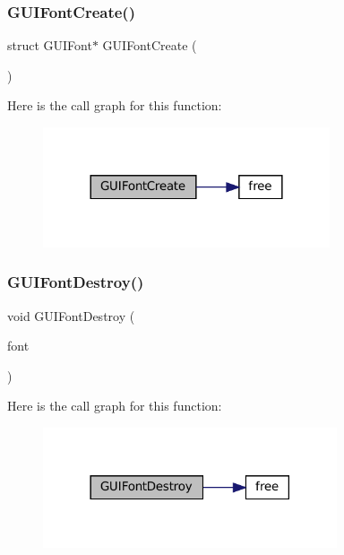 \subsubsection{\texorpdfstring{G\+U\+I\+Font\+Create()}{GUIFontCreate()}}
{\footnotesize\ttfamily struct G\+U\+I\+Font$\ast$ G\+U\+I\+Font\+Create (\begin{DoxyParamCaption}\item[{void}]{ }\end{DoxyParamCaption})}

Here is the call graph for this function\+:
\nopagebreak
\begin{figure}[H]
\begin{center}
\leavevmode
\includegraphics[width=240pt]{wii_2gui-font_8c_afeda865aa70118eb5e13639aeea185e5_cgraph}
\end{center}
\end{figure}
\mbox{\label{wii_2gui-font_8c_aa30d3bddfd055be2a203306973eb2b6a}} 
\subsubsection{\texorpdfstring{G\+U\+I\+Font\+Destroy()}{GUIFontDestroy()}}
{\footnotesize\ttfamily void G\+U\+I\+Font\+Destroy (\begin{DoxyParamCaption}\item[{struct G\+U\+I\+Font $\ast$}]{font }\end{DoxyParamCaption})}

Here is the call graph for this function\+:
\nopagebreak
\begin{figure}[H]
\begin{center}
\leavevmode
\includegraphics[width=246pt]{wii_2gui-font_8c_aa30d3bddfd055be2a203306973eb2b6a_cgraph}
\end{center}
\end{figure}
\mbox{\label{wii_2gui-font_8c_a7be283f1f320dc6308f9bc4ac24c4da7}} 
